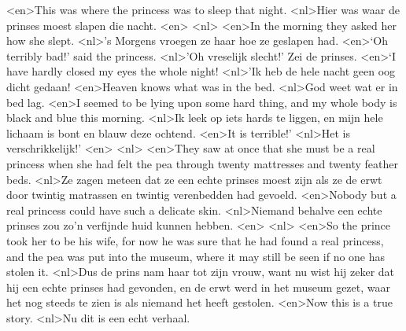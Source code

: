 <en>This was where the princess was to sleep that night.
<nl>Hier was waar de prinses  moest slapen die nacht.
<en>
<nl>
<en>In the morning they asked her how she slept.
<nl>'s Morgens vroegen ze haar hoe ze geslapen had.
<en>‘Oh terribly bad!’ said the princess.
<nl>'Oh vreselijk slecht!' Zei de prinses.
<en>‘I have hardly closed my eyes the whole night!
<nl>'Ik heb de hele nacht geen  oog dicht gedaan!
<en>Heaven knows what was in the bed.
<nl>God weet wat er in bed lag.
<en>I seemed to be lying upon some hard thing, and my whole body is black and blue this morning.
<nl>Ik leek op iets hards te liggen, en mijn hele lichaam is  bont en blauw deze ochtend.
<en>It is terrible!’
<nl>Het is verschrikkelijk!'
<en>
<nl>
<en>They saw at once that she must be a real princess when she had felt the pea through twenty mattresses and twenty feather beds.
<nl>Ze zagen meteen dat ze een echte prinses moest zijn als ze de erwt door twintig matrassen en twintig verenbedden had gevoeld.
<en>Nobody but a real princess could have such a delicate skin.
<nl>Niemand behalve een echte prinses zou zo'n verfijnde huid kunnen hebben.
<en>
<nl>
<en>So the prince took her to be his wife, for now he was sure that he had found a real princess, and the pea was put into the museum, where it may still be seen if no one has stolen it.
<nl>Dus de prins nam haar tot zijn vrouw, want nu wist hij zeker dat hij een echte prinses had gevonden, en de erwt werd in het museum gezet, waar het nog steeds te zien is als niemand het heeft gestolen.
<en>Now this is a true story.
<nl>Nu dit is een echt  verhaal.
